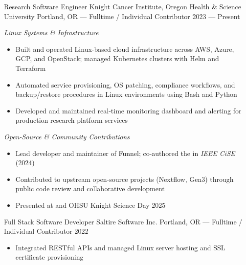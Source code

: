 \showoff
{Research Software Engineer}
{Knight Cancer Institute, Oregon Health \& Science University}
{Portland, OR --- Fulltime / Individual Contributor}
{2023 --- Present}

\vspace{1em}

\emph{Linux Systems \& Infrastructure}

\begin{itemize}
    \item Built and operated Linux-based cloud infrastructure across AWS, Azure, GCP, and OpenStack; managed Kubernetes clusters with Helm and Terraform
    \item Automated service provisioning, OS patching, compliance workflows, and backup/restore procedures in Linux environments using Bash and Python
    \item Developed and maintained real-time monitoring dashboard and alerting for production research platform services
\end{itemize}

\vspace{1em}

\emph{Open-Source \& Community Contributions}

\begin{itemize}
    \item Lead developer and maintainer of Funnel; co-authored the  in \emph{IEEE CiSE} (2024)
    \item Contributed to upstream open-source projects (Nextflow, Gen3) through public code review and collaborative development
    \item Presented at  and OHSU Knight Science Day 2025
\end{itemize}

\newpage

\showoff
{Full Stack Software Developer}
{Saltire Software Inc.}
{Portland, OR --- Fulltime / Individual Contributor}
{2022}

\begin{itemize}
    \item Integrated RESTful APIs and managed Linux server hosting and SSL certificate provisioning
\end{itemize}

\vspace*{\baselineskip}

